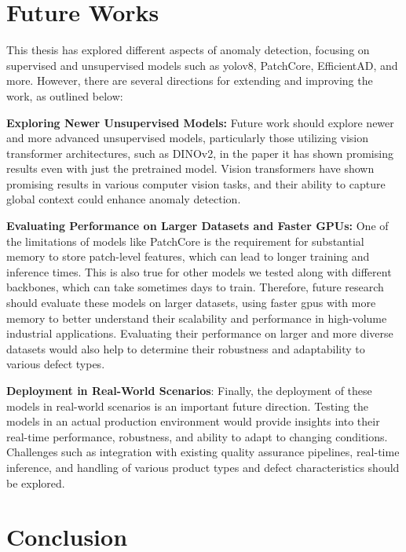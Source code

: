 \chapter{Future Works}

This thesis has explored different aspects of anomaly detection, focusing on supervised and unsupervised models such as \gls{yolo}v8, PatchCore, EfficientAD, and more. However, there are several directions for extending and improving the work, as outlined below:

\textbf{Exploring Newer Unsupervised Models:} Future work should explore newer and more advanced unsupervised models, particularly those utilizing vision transformer architectures, such as DINOv2\cite{oquab2023dinov2}, in the paper it has shown promising results even with just the pretrained model. Vision transformers have shown promising results in various computer vision tasks, and their ability to capture global context could enhance anomaly detection.

\textbf{Evaluating Performance on Larger Datasets and Faster GPUs:} One of the limitations of models like PatchCore is the requirement for substantial memory to store patch-level features, which can lead to longer training and inference times. This is also true for other models we tested along with different backbones, which can take sometimes days to train. Therefore, future research should evaluate these models on larger datasets, using faster \glspl{gpu} with more memory to better understand their scalability and performance in high-volume industrial applications. Evaluating their performance on larger and more diverse datasets would also help to determine their robustness and adaptability to various defect types.

\textbf{Deployment in Real-World Scenarios}: Finally, the deployment of these models in real-world scenarios is an important future direction. Testing the models in an actual production environment would provide insights into their real-time performance, robustness, and ability to adapt to changing conditions. Challenges such as integration with existing quality assurance pipelines, real-time inference, and handling of various product types and defect characteristics should be explored.

\chapter{Conclusion}

